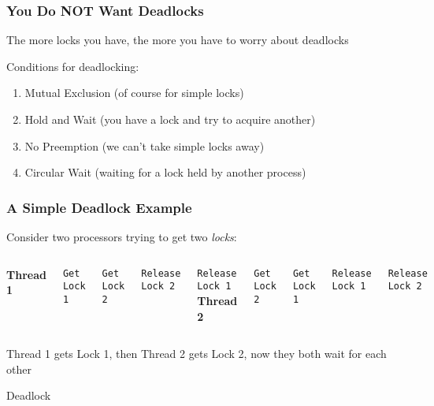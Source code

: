   \begin{frame}
    \frametitle{You Do NOT Want Deadlocks}

    The more locks you have, the more you have to worry about deadlocks

    \vspace{2em}

    Conditions for deadlocking:

    \begin{enumerate}
      \item Mutual Exclusion (of course for simple locks)
      \item Hold and Wait (you have a lock and try to acquire another)
      \item No Preemption (we can't take simple locks away)
      \item Circular Wait (waiting for a lock held by another process)
    \end{enumerate}
  \end{frame}

  \begin{frame}[containsverbatim]
    \frametitle{A Simple Deadlock Example}

    Consider two processors trying to get two {\it locks}:

    \vspace{2em}

    \begin{columns}
        {\bf Thread 1}

        \verb+Get Lock 1+

        \verb+Get Lock 2+

        \verb+Release Lock 2+

        \verb+Release Lock 1+
        {\bf Thread 2}

        \verb+Get Lock 2+

        \verb+Get Lock 1+

        \verb+Release Lock 1+

        \verb+Release Lock 2+
    \end{columns}

    \vspace{2em}

    Thread 1 gets Lock 1, then Thread 2 gets Lock 2, now
    they both wait for each other

    \hspace{2em} Deadlock
  \end{frame}

